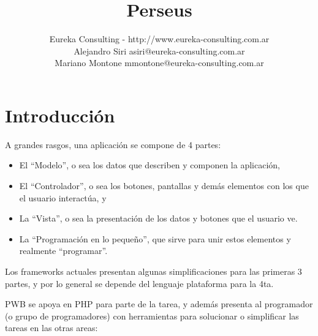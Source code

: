 \documentclass[a4paper,10pt]{article}
\title{Perseus}
\date{}
\author{Eureka Consulting - http://www.eureka-consulting.com.ar \\
		Alejandro Siri asiri@eureka-consulting.com.ar\\
		Mariano Montone mmontone@eureka-consulting.com.ar}
\begin{document}
\maketitle

\section{Introducción}

A grandes rasgos, una aplicación se compone de 4 partes:
\begin{itemize}
\item El ``Modelo'', o sea los datos que describen y componen la aplicación,
\item El ``Controlador'', o sea los botones, pantallas y demás elementos con los que el usuario interactúa, y
\item La ``Vista'', o sea la presentación de los datos y botones que el usuario ve.
\item La ``Programación en lo pequeño'', que sirve para unir estos elementos y realmente ``programar''.
\end{itemize}

Los frameworks actuales presentan algunas simplificaciones para las primeras 3 partes, y por lo general se
depende del lenguaje plataforma para la 4ta.

PWB se apoya en PHP para parte de la tarea, y además presenta al programador (o grupo de programadores) con
herramientas para solucionar o simplificar las tareas en las otras areas:
\end{document}
